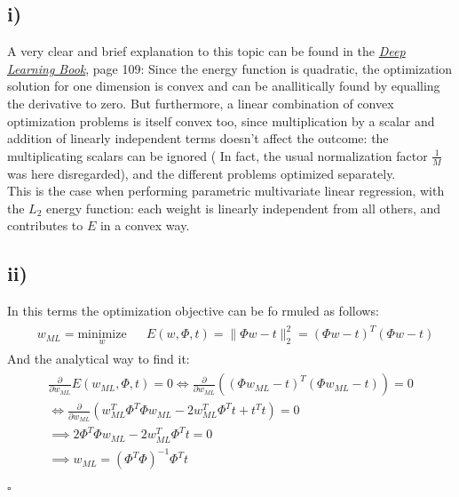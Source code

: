 \documentclass[11pt]{scrartcl} %
\begin{document}
         \subsection*{i)}
         A very clear and brief explanation to this topic can be found in the \href{https://github.com/dkorolev/DeepLearningBook/blob/master/DeepLearningBook.pdf}{{\it Deep Learning Book}}, page 109: Since the energy function is quadratic, the optimization solution for one dimension is convex and can be anallitically found by equalling the derivative to zero. But furthermore, a linear combination of convex optimization problems is itself convex too, since multiplication by a scalar and addition of linearly independent terms doesn't affect the outcome: the multiplicating scalars can be ignored ( In fact, the usual normalization factor \(\frac{1}{M}\) was here disregarded), and the different problems optimized separately.\\
         This is the case when performing parametric multivariate linear regression, with the \(L_2\) energy function: each weight is linearly independent from all others, and contributes to \(E\) in a convex way.
         \subsection*{ii)}
         In this terms the optimization objective can be fo
         rmuled as follows:
         \begin{align*}
           \begin{aligned}
             & w_{ML} = \underset{w}{\text{minimize}}
             & & E(w, \Phi, t) = \lVert \Phi w - t \rVert_2^2 = (\Phi w - t)^T(\Phi w - t)
           \end{aligned}
         \end{align*}
         And the analytical way to find it:
         \begin{align*}
           \begin{aligned}
             \frac{\partial}{\partial w_{ML}}  E (w_{ML}, \Phi, t) = 0 \iff \frac{\partial}{\partial w_{ML}} \left((\Phi w_{ML} - t)^T(\Phi w_{ML} - t) \right) = 0\\
             \iff \frac{\partial}{\partial w_{ML}} \left(w_{ML}^T\Phi^T\Phi w_{ML} - 2w_{ML}^T\Phi^Tt+t^Tt \right) = 0\\
             \implies 2\Phi^T\Phi w_{ML} - 2w_{ML}^T\Phi^Tt = 0 \\
             \implies w_{ML} = (\Phi^T\Phi)^{-1}\Phi^Tt
           \end{aligned}
         \end{align*}
         \begin{flushright}
           $\square$\\
         \end{flushright}
\end{document}
